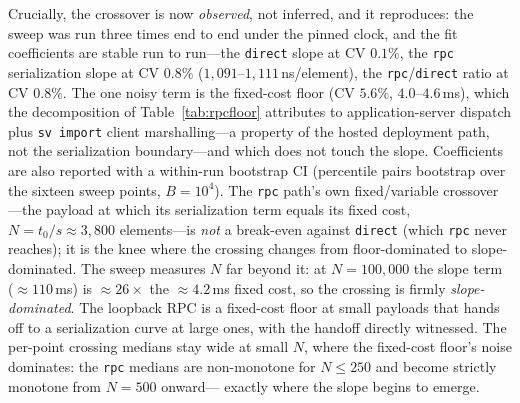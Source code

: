 \documentclass[conference]{IEEEtran}
\newcommand{\code}[1]{\texttt{#1}}
\begin{document}
Crucially, the crossover is now \emph{observed}, not inferred, and it reproduces:
the sweep was run three times end to end under the pinned clock, and the fit
coefficients are stable run to run---the \code{direct} slope at CV $0.1\%$, the
\code{rpc} serialization slope at CV $0.8\%$ ($1{,}091$--$1{,}111$\,ns/element), the
\code{rpc}/\code{direct} ratio at CV $0.8\%$. The one noisy term is the fixed-cost
floor (CV $5.6\%$, $4.0$--$4.6$\,ms), which the decomposition of
Table~\ref{tab:rpcfloor} attributes to application-server dispatch plus
\code{sv~import} client marshalling---a property of the hosted deployment path,
not the serialization boundary---and which does not touch the slope. Coefficients are also reported with a within-run
bootstrap CI (percentile pairs bootstrap over the sixteen sweep points, $B{=}10^4$).
The \code{rpc} path's own fixed/variable crossover---the payload at which its
serialization term equals its fixed cost, $N=t_0/s\approx3{,}800$ elements---is
\emph{not} a break-even against \code{direct} (which \code{rpc} never reaches); it
is the knee where the crossing changes from floor-dominated to slope-dominated.
The sweep measures $N$ far beyond it: at $N{=}100{,}000$ the slope term
($\approx$$110$\,ms) is $\approx$$26\times$ the $\approx$$4.2$\,ms fixed cost, so
the crossing is firmly \emph{slope-dominated}. The loopback RPC is a fixed-cost
floor at small payloads that hands off to a serialization curve at large ones,
with the handoff directly witnessed. The per-point crossing medians stay wide at
small $N$, where the fixed-cost floor's noise dominates: the \code{rpc} medians are
non-monotone for $N\le250$ and become strictly monotone from $N{=}500$ onward---%
exactly where the slope begins to emerge.
\end{document}
